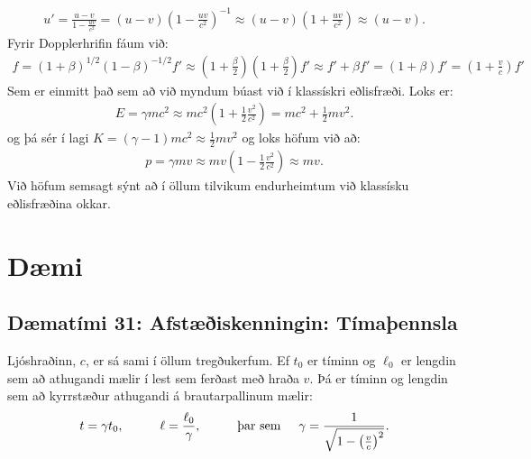 \begin{align*}
    u' = \frac{u-v}{1 - \frac{uv}{c^2}} = (u-v)\left(1 - \frac{uv}{c^2} \right)^{-1} \approx (u-v)\left(1 + \frac{uv}{c^2} \right) \approx (u-v).
\end{align*}
Fyrir Dopplerhrifin fáum við:
\begin{align*}
    f = \left(1 + \beta \right)^{1/2}\left(1 - \beta \right)^{-1/2} f' \approx \left(1 + \frac{\beta}{2} \right) \left(1 + \frac{\beta}{2} \right)f' \approx f' + \beta f' = (1+\beta)f' = \left(1 + \frac{v}{c} \right)f'
\end{align*}
Sem er einmitt það sem að við myndum búast við í klassískri eðlisfræði. Loks er:
\begin{align*}
    E = \gamma mc^2 \approx mc^2 \left(1 + \frac{1}{2}\frac{v^2}{c^2} \right) = mc^2 + \frac{1}{2}mv^2.
\end{align*}
og þá sér í lagi $K = (\gamma -1)mc^2 \approx \frac{1}{2}mv^2$ og loks höfum við að:
\begin{align*}
    p = \gamma mv \approx mv\left(1 - \frac{1}{2}\frac{v^2}{c^2} \right) \approx mv.
\end{align*}
Við höfum semsagt sýnt að í öllum tilvikum endurheimtum við klassísku eðlisfræðina okkar.


\newpage

\section{Dæmi}

\subsection*{Dæmatími 31: Afstæðiskenningin: Tímaþennsla}

\begin{tcolorbox}
Ljóshraðinn, $c$, er sá sami í öllum tregðukerfum. Ef $t_0$ er tíminn og $\ell_0$ er lengdin sem að athugandi mælir í lest sem ferðast með hraða $v$. Þá er tíminn og lengdin sem að kyrrstæður athugandi á brautarpallinum mælir:
\begin{align*}
    t = \gamma t_0, \hspace{1cm} \ell = \frac{\ell_0}{\gamma}, \hspace{1cm} \text{þar sem} \hspace{0.5cm} \gamma = \frac{1}{\sqrt{1-\left(\frac{v}{c}\right)^2}}.
\end{align*}
\end{tcolorbox}

